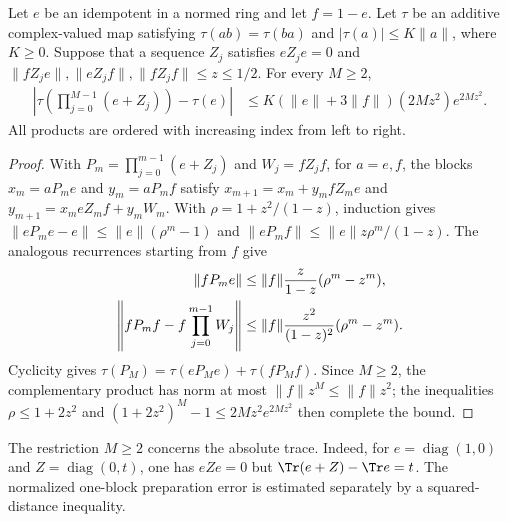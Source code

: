\begin{lemma}
    \label{thm:ldp_ordered_idempotent_quadratic}
    \leanok
    Let $e$ be an idempotent in a normed ring and let $f=1-e$. Let $\tau$
    be an additive complex-valued map satisfying $\tau(ab)=\tau(ba)$ and
    $|\tau(a)|\le K\lVert a\rVert$, where $K\ge0$. Suppose that a sequence
    $Z_j$ satisfies $eZ_je=0$ and
    $\lVert fZ_je\rVert,\lVert eZ_jf\rVert,\lVert fZ_jf\rVert\le z\le1/2$.
    For every $M\ge2$,
    \begin{align}
        \left|\tau\left(\prod_{j=0}^{M-1}(e+Z_j)\right)-\tau(e)\right|
         & \le K(\lVert e\rVert+3\lVert f\rVert)
        (2Mz^2)e^{2Mz^2}.
        \label{eq:ldp_ordered_quadratic_trace}
    \end{align}
    All products are ordered with increasing index from left to right.
\end{lemma}
\begin{proof}\leanok
    With $P_m=\prod_{j=0}^{m-1}(e+Z_j)$ and $W_j=fZ_jf$, for $a=e,f$,
    the blocks $x_m=aP_me$ and $y_m=aP_mf$ satisfy
    $x_{m+1}=x_m+y_mfZ_me$ and
    $y_{m+1}=x_meZ_mf+y_mW_m$.
    With $\rho=1+z^2/(1-z)$, induction gives
    $\lVert eP_me-e\rVert\le\lVert e\rVert(\rho^m-1)$ and
    $\lVert eP_mf\rVert\le\lVert e\rVert z\rho^m/(1-z)$.
    The analogous recurrences starting from $f$ give
    \begin{align}
        \lVert fP_me\rVert
         & \le\lVert f\rVert\frac{z}{1-z}(\rho^m-z^m), \notag \\
        \left\lVert fP_mf-f\prod_{j=0}^{m-1}W_j\right\rVert
         & \le\lVert f\rVert\frac{z^2}{(1-z)^2}(\rho^m-z^m).
        \notag
    \end{align}
    Cyclicity gives $\tau(P_M)=\tau(eP_Me)+\tau(fP_Mf)$.
    Since $M\ge2$, the complementary product has norm at most
    $\lVert f\rVert z^M\le\lVert f\rVert z^2$; the inequalities
    $\rho\le1+2z^2$ and $(1+2z^2)^M-1\le2Mz^2e^{2Mz^2}$ then complete the bound.
\end{proof}

The restriction $M\ge2$ concerns the absolute trace. Indeed, for
$e=\operatorname{diag}(1,0)$ and $Z=\operatorname{diag}(0,t)$,
one has $eZe=0$ but $\Tr(e+Z)-\Tr e=t$. The normalized one-block
preparation error is estimated separately by a squared-distance inequality.


